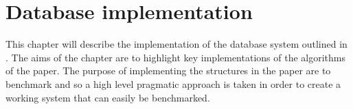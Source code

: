 \chapter{Database implementation}\label{chap:database}
This chapter will describe the implementation of the database system outlined in
\relalg{}. The aims of the chapter are to highlight key implementations of the
algorithms of the paper. The purpose of implementing the structures in the paper
are to benchmark and so a high level pragmatic approach is taken in order to
create a working system that can easily be benchmarked.

